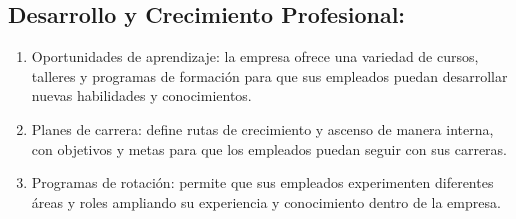 \documentclass{article}
\begin{document}
 


 


 



 





\subsection{Desarrollo y Crecimiento Profesional:}

\begin{enumerate}
  \item Oportunidades de aprendizaje: la empresa ofrece una variedad de cursos, talleres y programas de formación para que sus empleados puedan desarrollar nuevas habilidades y conocimientos.
  \item Planes de carrera: define rutas de crecimiento y ascenso de manera interna, con objetivos y metas para que los empleados puedan seguir con sus carreras.
  \item Programas de rotación: permite que sus empleados experimenten diferentes áreas y roles ampliando su experiencia y conocimiento dentro de la empresa.
\end{enumerate}
\end{document}
